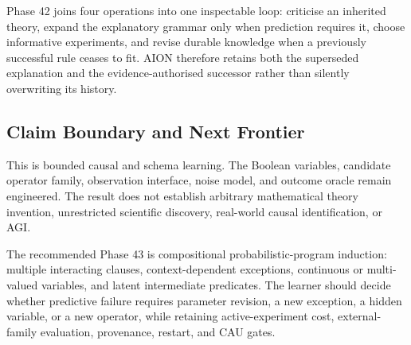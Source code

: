 Phase 42 joins four operations into one inspectable loop: criticise an inherited
theory, expand the explanatory grammar only when prediction requires it, choose
informative experiments, and revise durable knowledge when a previously
successful rule ceases to fit. AION therefore retains both the superseded
explanation and the evidence-authorised successor rather than silently
overwriting its history.

\subsection{Claim Boundary and Next Frontier}

This is bounded causal and schema learning. The Boolean variables, candidate
operator family, observation interface, noise model, and outcome oracle remain
engineered. The result does not establish arbitrary mathematical theory
invention, unrestricted scientific discovery, real-world causal
identification, or AGI.

The recommended Phase 43 is compositional probabilistic-program induction:
multiple interacting clauses, context-dependent exceptions, continuous or
multi-valued variables, and latent intermediate predicates. The learner should
decide whether predictive failure requires parameter revision, a new exception,
a hidden variable, or a new operator, while retaining active-experiment cost,
external-family evaluation, provenance, restart, and CAU gates.
